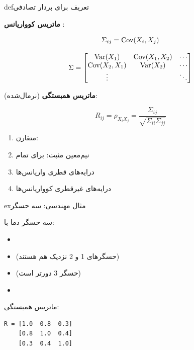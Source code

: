 
\begin{PSbox}[unbreakable]{def}{تعریف برای بردار تصادفی }

\textbf{ماتریس کوواریانس} \lr{\ensuremath{\Sigma}}:

\[\Sigma_{ij} = \text{Cov}(X_i, X_j)\]

\[\Sigma = \begin{bmatrix} \text{Var}(X_1) & \text{Cov}(X_1,X_2) & \cdots \\ \text{Cov}(X_2,X_1) & \text{Var}(X_2) & \cdots \\ \vdots & & \ddots \end{bmatrix}\]

\textbf{ماتریس همبستگی}  (نرمال‌شده):

\[R_{ij} = \rho_{X_i X_j} = \frac{\Sigma_{ij}}{\sqrt{\Sigma_{ii}\Sigma_{jj}}}\]

\end{PSbox}


\begin{enumerate}
\def\labelenumi{\arabic{enumi}.}
\tightlist
\item
  متقارن: 
\item
  نیم‌معین مثبت:  برای تمام 
\item
  درایه‌های قطری \lr{=} واریانس‌ها
\item
  درایه‌های غیرقطری \lr{=} کوواریانس‌ها
\end{enumerate}

\begin{PSbox}[unbreakable]{ex}{مثال مهندسی: سه حسگر}

سه حسگر دما با:

\begin{itemize}
\tightlist
\item
\item
   (حسگرهای 1 و 2 نزدیک هم هستند)
\item
   (حسگر 3 دورتر است)
\item
\end{itemize}

ماتریس همبستگی:


\begin{PSplaincode}
\begin{Verbatim}
R = [1.0  0.8  0.3]
    [0.8  1.0  0.4]
    [0.3  0.4  1.0]
\end{Verbatim}
\end{PSplaincode}

\end{PSbox}

